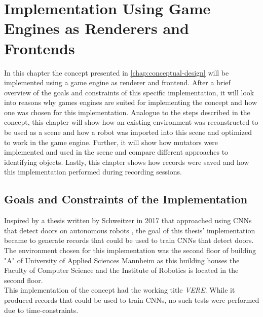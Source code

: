 \chapter{Implementation Using Game Engines as Renderers and Frontends}
\label{chap:implementations}
In this chapter the concept presented in \ref{chap:conceptual-design} will be implemented using a game engine as renderer and frontend. After a brief overview of the goals and constraints of this specific implementation, it will look into reasons why games engines are suited for implementing the concept and how one was chosen for this implementation. Analogue to the steps described in the concept, this chapter will show how an existing environment was reconstructed to be used as a scene and how a robot was imported into this scene and optimized to work in the game engine. Further, it will show how mutators were implemented and used in the scene and compare different approaches to identifying objects. Lastly, this chapter shows how records were saved and how this implementation performed during recording sessions.

\section{Goals and Constraints of the Implementation}
\label{section:goals-and-constraints}
Inspired by a thesis written by Schweitzer in 2017 that approached using \acsp{CNN} that detect doors on autonomous robots \cite{Schweitzer2017}, the goal of this thesis' implementation became to generate records that could be used to train \acsp{CNN} that detect doors.\\ 
The environment chosen for this implementation was the second floor of building "A" of University of Applied Sciences Mannheim as this building houses the Faculty of Computer Science and the Institute of Robotics is located in the second floor.\\
This implementation of the concept had the working title \emph{\ac{VERE}}. While it produced records that could be used to train \acsp{CNN}, no such tests were performed due to time-constraints.

